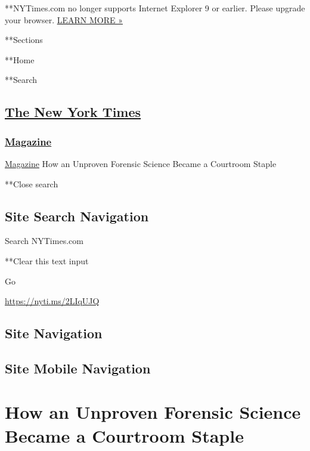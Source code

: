  **NYTimes.com no longer supports Internet Explorer 9 or earlier. Please
upgrade your browser.
\href{http://www.nytimes3xbfgragh.onion/content/help/site/ie9-support.html}{LEARN
MORE »}

**Sections

**Home

**Search

\hypertarget{the-new-york-times}{%
\subsection{\texorpdfstring{\href{http://www.nytimes3xbfgragh.onion/}{The
New York Times}}{The New York Times}}\label{the-new-york-times}}

\hypertarget{-magazine-}{%
\subsubsection{\texorpdfstring{
\href{https://www.nytimes3xbfgragh.onion/section/magazine}{Magazine}
}{ Magazine }}\label{-magazine-}}

 \href{https://www.nytimes3xbfgragh.onion/section/magazine}{Magazine}
\textbar{}How an Unproven Forensic Science Became a Courtroom Staple

**Close search

\hypertarget{site-search-navigation}{%
\subsection{Site Search Navigation}\label{site-search-navigation}}

Search NYTimes.com

**Clear this text input

Go

\url{https://nyti.ms/2LIqUJQ}

\hypertarget{site-navigation}{%
\subsection{Site Navigation}\label{site-navigation}}

\hypertarget{site-mobile-navigation}{%
\subsection{Site Mobile Navigation}\label{site-mobile-navigation}}

\hypertarget{how-an-unproven-forensic-science-became-a-courtroom-staple}{%
\section{How an Unproven Forensic Science Became a Courtroom
Staple}\label{how-an-unproven-forensic-science-became-a-courtroom-staple}}

